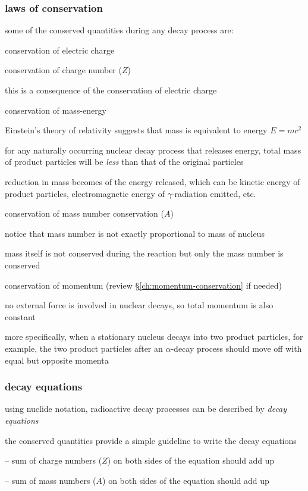 \subsubsection{laws of conservation}

some of the conserved quantities during any decay process are:

\cmt conservation of electric charge

\cmt conservation of charge number ($Z$)

this is a consequence of the conservation of electric charge

\cmt conservation of mass-energy

Einstein's theory of relativity suggests that mass is equivalent to energy $E=mc^2$

for any naturally occurring nuclear decay process that releases energy, total mass of product particles will be \emph{less} than that of the original particles

reduction in mass becomes of the energy released, which can be kinetic energy of product particles, electromagnetic energy of $\gamma$-radiation emitted, etc.

\cmt conservation of mass number conservation ($A$)

notice that mass number is not exactly proportional to mass of nucleus

mass itself is not conserved during the reaction but only the mass number is conserved

\cmt conservation of momentum (review \S\ref{ch:momentum-conservation} if needed)

no external force is involved in nuclear decays, so total momentum is also constant

more specifically, when a stationary nucleus decays into two product particles, for example, the two product particles after an $\alpha$-decay process should move off with equal but opposite momenta


\subsubsection{decay equations}

using nuclide notation, radioactive decay processes can be described by \emph{decay equations}

the conserved quantities provide a simple guideline to write the decay equations 

\begin{compactenum}
	\item[--] sum of charge numbers ($Z$) on both sides of the equation should add up
	
	\item[--] sum of mass numbers ($A$) on both sides of the equation should add up
\end{compactenum}



